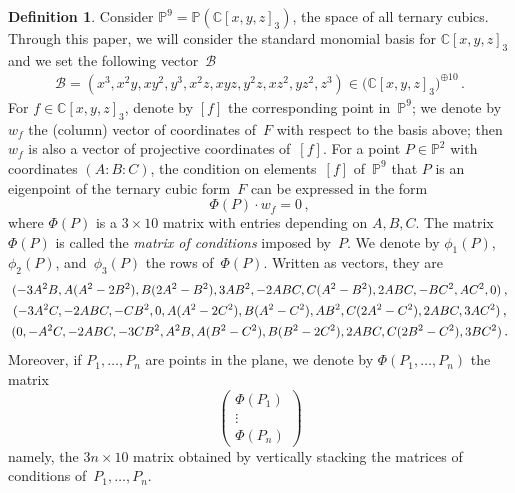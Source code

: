 \documentclass{amsart}
\theoremstyle{plain}
\theoremstyle{definition}
\newtheorem{definition}[lemma]{Definition}
\newcommand{\C}{\mathbb{C}}
\newcommand{\p}{\mathbb{P}}
\newcommand\scalemath[2]{\scalebox{#1}{\mbox{\ensuremath{\displaystyle #2}}}}
\begin{document}
\begin{definition}
\label{definition:matrix_conditions}
 Consider $\p^9 = \p(\C[x,y,z]_3)$, the space of all ternary cubics.
 Through this paper, we will consider the standard monomial basis for $\C[x,y,z]_3$ and we set the following vector~$\mathcal{B}$
 \begin{eqnarray}
  \mathcal{B} = (x^3, x^2 y, x y^2, y^3, x^2 z, x y z, y^2 z, x z^2, y z^2, z^3)
  \in \bigl( \C[x,y,z]_3 \bigr)^{\oplus 10} \,.
  \label{vector_basis}
 \end{eqnarray}
 For $f \in \C[x,y,z]_3$, denote by $[f]$ the corresponding point in~$\p^9$; we denote by $w_f$ the (column) vector of coordinates of~$F$ with respect to the basis above; then $w_f$ is also a vector of projective coordinates of~$[f]$.
 For a point $P \in \p^2$ with coordinates $(A: B: C)$, the condition on elements~$[f]$ of~$\p^9$ that $P$ is an eigenpoint of the ternary cubic form~$F$ can be expressed in the form
 \[
  \Phi(P) \cdot w_f
  = 0 \,,
 \]
 where $\Phi(P)$ is a $3 \times 10$ matrix with entries depending on $A, B, C$.
 The matrix $\Phi(P)$ is called the \emph{matrix of conditions} imposed by~$P$.
We denote by $\phi_1(P)$, $\phi_2(P)$, and~$\phi_3(P)$ the rows of~$\Phi(P)$.
Written as vectors, they are
%
\begin{equation}
\label{equation:matrix_conditions_rows}
\begin{gathered}
\scalemath{0.9}{(-3A^2B, A(A^2 - 2B^2), B(2A^2 - B^2), 3AB^2,
 -2ABC, C(A^2 - B^2), 2 ABC,
 -B  C^2, A  C^2, 0)} \,, \\
\scalemath{0.9}{(-3A^2 C,
-2ABC,
-CB^2,
0,
A(A^2-2C^2),
B(A^2 - C^2),
AB^2,
C(2A^2-C^2),
2ABC,
3AC^2)} \,,\\
\scalemath{0.9}{(0,
-A^2C,
-2ABC,
-3CB^2,
A^2 B,
A(B^2 - C^2),
B(B^2-2C^2),
2ABC,
C(2B^2-C^2),
3BC^2)} \,.
\end{gathered}
\end{equation}
%
Moreover, if $P_1, \dotsc, P_n$ are points in the plane, we denote by $\Phi(P_1, \dotsc, P_n)$ the matrix
%
\[
 \left(
 \begin{array}{c}
  \Phi(P_1) \\
  \vdots \\
  \Phi(P_n)
 \end{array}
 \right)
\]
%
namely, the $3n \times 10$ matrix obtained by vertically stacking the matrices of conditions of~$P_1, \dotsc, P_n$.
\end{definition}
\end{document}
